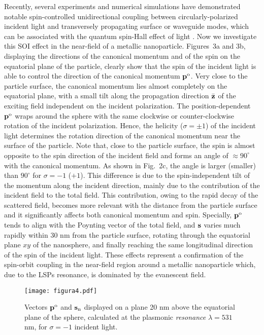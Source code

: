 \documentclass[journal=apchd5,manuscript=article]{achemso}
\begin{document}
Recently, several experiments and numerical simulations have demonstrated notable spin-controlled unidirectional coupling between circularly-polarized incident light and transversely propagating surface or waveguide modes, which can be associated with the quantum spin-Hall effect of light  \cite{bliokh2015, bliokh2015spin,bliokh2015quantum}. Now we investigate this SOI effect in the near-field of a metallic nanoparticle. Figures~3a and 3b, displaying the directions of the canonical momentum and of the spin on the equatorial plane of the particle, clearly show that the spin of the incident light is able to control the direction of the canonical momentum ${\bf p}^{\rm o}$. Very close to the particle surface, the canonical momentum lies almost completely on the equatorial plane, with a small tilt along the propagation direction $\bar {\bf z}$ of the exciting field independent on the incident polarization. The position-dependent ${\bf p}^{\rm o}$ wraps around the sphere with the same clockwise or counter-clockwise rotation of the incident polarization. Hence, the helicity ($\sigma = \pm 1$) of the incident light determines the rotation direction of the canonical momentum  near the surface of the particle. Note that, close to the particle surface, the spin is almost opposite to the spin direction of the incident field and forms an angle of  $ \approx 90^{\circ}$ with the canonical momentum. As shown in Fig.~2c, the angle is larger (smaller) than $90^{\circ}$ for $\sigma = -1$ ($+1$). This difference is due to the spin-independent tilt of the momentum along the incident direction, mainly due to the contribution of the incident field to the total field. This contribution, owing to the rapid decay of the scattered field, becomes more relevant with the distance from the particle surface and it significantly affects both canonical momentum and spin. Specially, ${\bf p}^{\rm o}$ tends to align with the Poynting vector of the total field, and ${\bf s}$ varies much rapidly within 30 nm from the particle surface, rotating through the equatorial plane $xy$ of the nanosphere, and finally reaching the same longitudinal direction of the spin of the incident light. These effects represent a confirmation of the spin-orbit coupling \cite{bliokh2015spin} in the near-field region around a metallic nanoparticle which, due to the LSPs resonance, is dominated by the evanescent field.


\begin{figure}[!ht]
	\centering
	\texttt{[image: figura4.pdf]}
	\caption{Vectors $\bf p^{\rm o}$ and ${\bf s}_{\rm n}$ displayed on a plane 20 nm above the equatorial plane of the sphere, calculated at the plasmonic \textit{resonance} $\lambda = 531$ nm, for  $\sigma = -1$ incident light.
		\label{fig:4}}
\end{figure}
\end{document}
